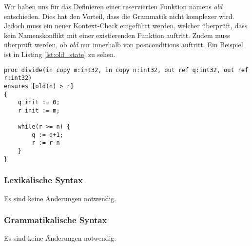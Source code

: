 Wir haben uns für das Definieren einer reservierten Funktion namens \textit{old} 
entschieden. Dies hat den Vorteil, dass die Grammatik nicht komplexer wird. Jedoch 
muss ein neuer Kontext-Check eingeführt werden, welcher überprüft, dass kein Namenskonflikt
mit einer existierenden Funktion auftritt. Zudem muss überprüft werden, ob \textit{old} 
nur innerhalb von postconditions auftritt. Ein Beispiel ist in Listing \ref{lst:old_state} zu sehen.
\begin{lstlisting}[caption=Beispiel eines Zugriffs auf alten Zustand,label={lst:old_state}]
proc divide(in copy m:int32, in copy n:int32, out ref q:int32, out ref r:int32)
ensures [old(n) > r]
{
    q init := 0;
    r init := m;

    while(r >= n) {
        q := q+1;
        r := r-n
    }
}
\end{lstlisting}

\subsubsection{Lexikalische Syntax}
Es sind keine Änderungen notwendig.

\subsubsection{Grammatikalische Syntax}
Es sind keine Änderungen notwendig.


\newpage
